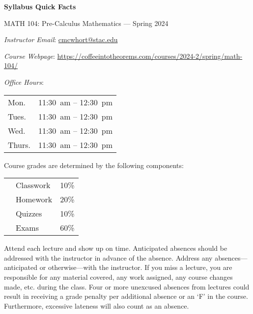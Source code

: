 \documentclass[11pt,letterpaper]{article}
\begin{document}
\begin{center} 
\bfseries
\color{stacred}
\LARGE Syllabus Quick Facts \par\vspace{0.2\baselineskip}
\Large MATH 104: Pre-Calculus Mathematics --- Spring 2024
\end{center} \pspace


\hspace{0.53cm} {\itshape Instructor Email}: \href{mailto:cmcwhort@stac.edu}{cmcwhort@stac.edu} \par
\hspace{0.53cm} {\itshape Course Webpage}: \href{https://coffeeintotheorems.com/courses/2024-2/spring/math-104/}{https://coffeeintotheorems.com/courses/2024-2/spring/math-104/} \par
\hspace{0.53cm} {\itshape Office Hours}: 	\par \vspace{-0.3cm}
	\begin{table}[!ht]
	\centering
	\begin{tabular}{l || l}
	Mon. & 11:30~am -- 12:30~pm \\
	Tues. & 11:30~am -- 12:30~pm \\
	Wed. & 11:30~am -- 12:30~pm \\
	Thurs. & 11:30~am -- 12:30~pm \\
	\end{tabular}
	\end{table} \pspace


Course grades are determined by the following components: \par \vspace{-0.3cm}
	\begin{table}[!ht]
        \begin{tabular}{clr}
        & Classwork & 10\% \\
        & Homework & 20\% \\
	& Quizzes & 10\% \\
	& Exams & 60\% 
        \end{tabular} 
        \end{table} \sectionbreak


Attend each lecture and show up on time. Anticipated absences should be addressed with the instructor in advance of the absence. Address any absences---anticipated or otherwise---with the instructor. If you miss a lecture, you are responsible for any material covered, any work assigned, any course changes made, etc. during the class. Four or more unexcused absences from lectures could result in receiving a grade penalty per additional absence or an `F' in the course. Furthermore, excessive lateness will also count as an absence. \pspace
\sectionbreak
\end{document}
